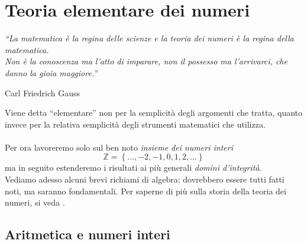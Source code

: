 \chapter{Teoria elementare dei numeri}
\label{lezione1}
\epigraph{\textit{\enquote{La matematica è la regina delle scienze e la teoria dei numeri è la regina della matematica. \\ Non è la conoscenza ma l'atto di imparare, non il possesso ma l'arrivarci, che danno la gioia maggiore.}}}{Carl Friedrich Gauss}
Viene detta \enquote{elementare} non per la semplicità degli argomenti che tratta, quanto invece per la relativa semplicità degli strumenti matematici che utilizza. \\ \\
Per ora lavoreremo solo sul ben noto \textit{insieme dei numeri interi}
\begin{equation*}
	\mathbb{Z}= \left\{\dots,-2,-1,0,1,2,\dots\right\}
\end{equation*}
ma in seguito estenderemo i risultati ai più generali \textit{domini d'integrità}. \\ 
Vediamo adesso alcuni brevi richiami di algebra; dovrebbero essere tutti fatti noti, ma saranno fondamentali. Per saperne di più sulla storia della teoria dei numeri, si veda \cite{D19}\cite{G97}.


\section{Aritmetica e numeri interi}
